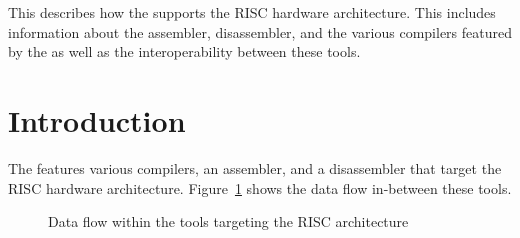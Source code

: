 




\renewcommand{\seerisc}{}

{This \documentation{} describes how the \ecs{} supports the RISC hardware architecture.
This includes information about the assembler, disassembler, and the various compilers featured by the \ecs{} as well as the interoperability between these tools.}

\section{Introduction}

The \ecs{} features various compilers, an assembler, and a disassembler that target the RISC hardware architecture.
Figure~\ref{fig:riscdataflow} shows the data flow in-between these tools.

\begin{figure}
\caption{Data flow within the tools targeting the RISC architecture}
\label{fig:riscdataflow}
\end{figure}

